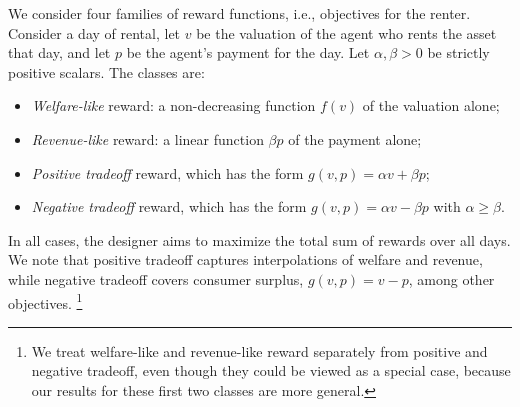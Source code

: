 \documentclass[11pt,letterpaper]{article}
\theoremstyle{plain}
\begin{document}
We consider four families of reward functions,
i.e., objectives for the renter.
Consider a day of rental, let $v$ be the valuation of the agent who rents the asset that day, and let $p$ be the agent's payment for the day. 
Let $\alpha,\beta>0$ be strictly positive scalars. The classes are:
\begin{itemize} 
    \item \emph{Welfare-like} reward: a non-decreasing function $f(v)$ of the valuation alone;
    \item \emph{Revenue-like} reward: a linear function $\beta p$ of the payment alone;
    \item \emph{Positive tradeoff} reward, which has the form $g(v, p) = \alpha v + \beta p$;
    \item \emph{Negative tradeoff} reward, which has the form $g(v, p) = \alpha v - \beta p$ with $\alpha\geq\beta$. %
\end{itemize}
In all cases, the designer aims to maximize the total sum of rewards over all days. We note that positive tradeoff captures interpolations of welfare and revenue, while negative tradeoff covers consumer surplus,
$g(v,p) = v-p$,  among other objectives.
\footnote{We treat welfare-like and revenue-like reward separately from positive and negative tradeoff, even though they could be viewed as a special case, because our results for these first two classes are more general.}

\end{document}
